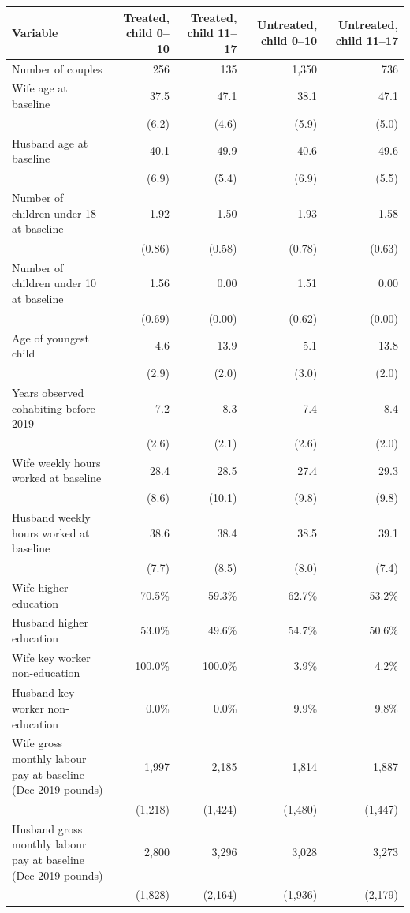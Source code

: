 
\begin{tabular}{lrrrr}
\toprule
Variable & Treated, child 0--10 & Treated, child 11--17 & Untreated, child 0--10 & Untreated, child 11--17\\
\midrule
Number of couples & 256 & 135 & 1,350 & 736\\
Wife age at baseline & 37.5 & 47.1 & 38.1 & 47.1\\
 & (6.2) & (4.6) & (5.9) & (5.0)\\
Husband age at baseline & 40.1 & 49.9 & 40.6 & 49.6\\
 & (6.9) & (5.4) & (6.9) & (5.5)\\
Number of children under 18 at baseline & 1.92 & 1.50 & 1.93 & 1.58\\
 & (0.86) & (0.58) & (0.78) & (0.63)\\
Number of children under 10 at baseline & 1.56 & 0.00 & 1.51 & 0.00\\
 & (0.69) & (0.00) & (0.62) & (0.00)\\
Age of youngest child & 4.6 & 13.9 & 5.1 & 13.8\\
 & (2.9) & (2.0) & (3.0) & (2.0)\\
Years observed cohabiting before 2019 & 7.2 & 8.3 & 7.4 & 8.4\\
 & (2.6) & (2.1) & (2.6) & (2.0)\\
Wife weekly hours worked at baseline & 28.4 & 28.5 & 27.4 & 29.3\\
 & (8.6) & (10.1) & (9.8) & (9.8)\\
Husband weekly hours worked at baseline & 38.6 & 38.4 & 38.5 & 39.1\\
 & (7.7) & (8.5) & (8.0) & (7.4)\\
Wife higher education & 70.5\% & 59.3\% & 62.7\% & 53.2\%\\
Husband higher education & 53.0\% & 49.6\% & 54.7\% & 50.6\%\\
Wife key worker non-education & 100.0\% & 100.0\% & 3.9\% & 4.2\%\\
Husband key worker non-education & 0.0\% & 0.0\% & 9.9\% & 9.8\%\\
Wife gross monthly labour pay at baseline (Dec 2019 pounds) & 1,997 & 2,185 & 1,814 & 1,887\\
 & (1,218) & (1,424) & (1,480) & (1,447)\\
Husband gross monthly labour pay at baseline (Dec 2019 pounds) & 2,800 & 3,296 & 3,028 & 3,273\\
 & (1,828) & (2,164) & (1,936) & (2,179)\\
\bottomrule
\end{tabular}
